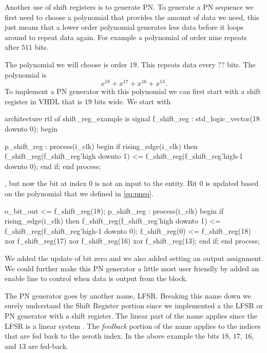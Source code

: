 Another use of shift registers is to generate \ac{PN}. To generate a \ac{PN} sequence we first need to choose a polynomial that provides the amount of data we need, this just means that a lower order polynomial generates less data before it loops around to repeat data again. For example a polynomial of order nine repeats after $511$ bits. 

The polynomial we will choose is order $19$. This repeats data every ?? bits. The polynomial is 
\begin{equation}
x^{18} + x^{17} + x^{16} + x^{13}. 
\label{eq:pneq}
\end{equation}
\noindent
To implement a \ac{PN} generator with this polynomial we can first start with a shift register in \ac{VHDL} that is $19$ bits wide. We start with 

\begin{VHDLlisting}[tabsize=4]
architecture rtl of shift\_reg\_example is
	signal f\_shift\_reg : std\_logic\_vector(18 downto 0);
begin

p\_shift\_reg : process(i\_clk)
begin
	if rising\_edge(i\_clk) then
		f\_shift\_reg(f\_shift\_reg'high downto 1) <= f\_shift\_reg(f\_shift\_reg'high-1 downto 0);
	end if;
end process;
\end{VHDLlisting}

, but now the bit at index $0$ is not an input to the entity. Bit $0$ is updated based on the polynomial that we defined in \ref{eq:pneq}. 	

\begin{VHDLlisting}[tabsize=4]
o\_bit\_out <= f\_shift\_reg(18);
p\_shift\_reg : process(i\_clk)
begin
	if rising\_edge(i\_clk) then
		f\_shift\_reg(f\_shift\_reg'high downto 1) <= f\_shift\_reg(f\_shift\_reg'high-1 downto 0);
		f\_shift\_reg(0) <= f\_shift\_reg(18) xor 
						  f\_shift\_reg(17) xor 
						  f\_shift\_reg(16) xor 
						  f\_shift\_reg(13);
	end if;
end process;
\end{VHDLlisting}

We added the update of bit zero and we also added setting an output assignment. We could further make this \ac{PN} generator a little most user friendly by added an enable line to control when data is output from the block.

The \ac{PN} generator goes by another name, \ac{LFSR}. Breaking this name down we surely understand the \ac{Shift Register} portion since we implemented a the \ac{LFSR} or \ac{PN} generator with a shift register. The linear part of the name applies since the \ac{LFSR} is a linear system \cite{??}. The \emph{feedback} portion of the name applies to the indices that are fed back to the zeroth index. In the above example the bits $18$, $17$, $16$, and $13$ are fed-back.


